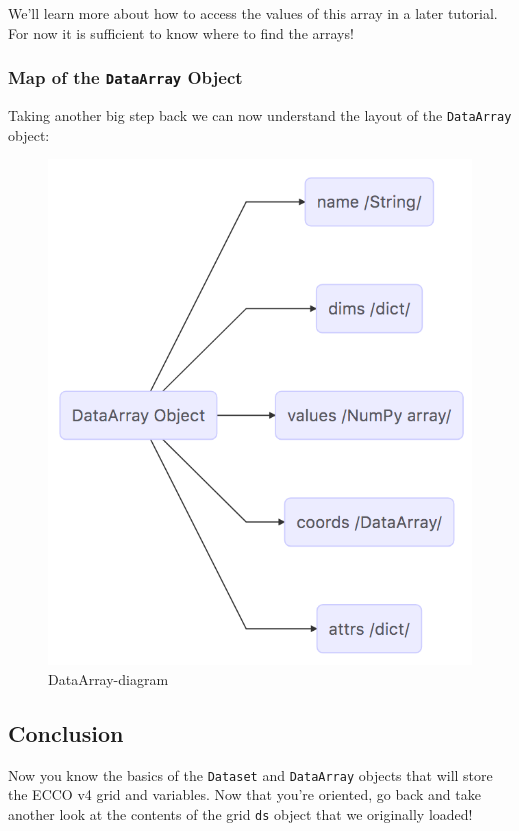 \documentclass[11pt]{article}
\makeatletter
\def\maxwidth{\ifdim\Gin@nat@width>\linewidth\linewidth
    \else\Gin@nat@width\fi}
\let\Oldincludegraphics\includegraphics
\renewcommand{\includegraphics}[1]{\Oldincludegraphics[width=.8\maxwidth]{#1}}
\makeatother
\begin{document}
We'll learn more about how to access the values of this array in a later
tutorial. For now it is sufficient to know where to find the arrays!

\subsubsection{\texorpdfstring{Map of the \texttt{DataArray}
Object}{Map of the DataArray Object}}\label{map-of-the-dataarray-object}

Taking another big step back we can now understand the layout of the
\texttt{DataArray} object:

\begin{figure}
\centering
\includegraphics{../figures/DataArray-diagram.png}
\caption{DataArray-diagram}
\end{figure}

    \subsection{Conclusion}\label{conclusion}

Now you know the basics of the \texttt{Dataset} and \texttt{DataArray}
objects that will store the ECCO v4 grid and variables. Now that you're
oriented, go back and take another look at the contents of the grid
\texttt{ds} object that we originally loaded!


    
    
    
    
\end{document}
